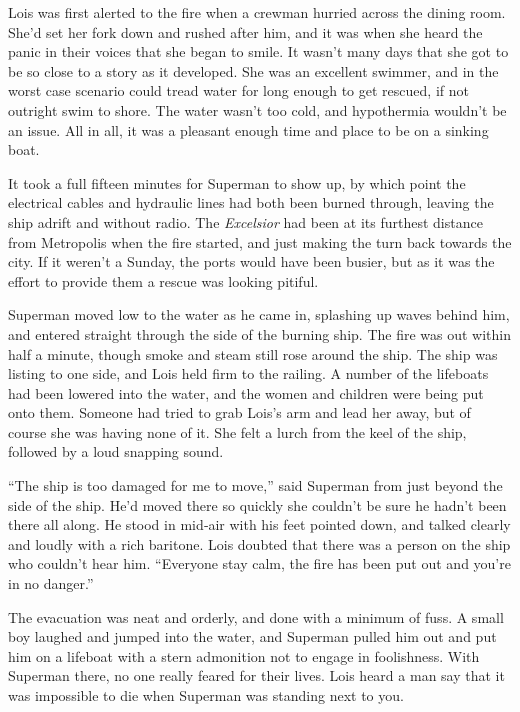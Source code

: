 \documentclass[ebook,12pt]{memoir}
\begin{document}
Lois was first alerted to the fire when a crewman hurried across the
dining room. She'd set her fork down and rushed after him, and it was
when she heard the panic in their voices that she began to smile. It
wasn't many days that she got to be so close to a story as it developed.
She was an excellent swimmer, and in the worst case scenario could tread
water for long enough to get rescued, if not outright swim to shore. The
water wasn't too cold, and hypothermia wouldn't be an issue. All in all,
it was a pleasant enough time and place to be on a sinking boat.

It took a full fifteen minutes for Superman to show up, by which point
the electrical cables and hydraulic lines had both been burned through,
leaving the ship adrift and without radio. The \emph{Excelsior} had been
at its furthest distance from Metropolis when the fire started, and just
making the turn back towards the city. If it weren't a Sunday, the ports
would have been busier, but as it was the effort to provide them a
rescue was looking pitiful.

Superman moved low to the water as he came in, splashing up waves behind
him, and entered straight through the side of the burning ship. The fire
was out within half a minute, though smoke and steam still rose around
the ship. The ship was listing to one side, and Lois held firm to the
railing. A number of the lifeboats had been lowered into the water, and
the women and children were being put onto them. Someone had tried to
grab Lois's arm and lead her away, but of course she was having none of
it. She felt a lurch from the keel of the ship, followed by a loud
snapping sound.

``The ship is too damaged for me to move,'' said Superman from just
beyond the side of the ship. He'd moved there so quickly she couldn't be
sure he hadn't been there all along. He stood in mid‐air with his feet
pointed down, and talked clearly and loudly with a rich baritone. Lois
doubted that there was a person on the ship who couldn't hear him.
``Everyone stay calm, the fire has been put out and you're in no
danger.''

The evacuation was neat and orderly, and done with a minimum of fuss. A
small boy laughed and jumped into the water, and Superman pulled him out
and put him on a lifeboat with a stern admonition not to engage in
foolishness. With Superman there, no one really feared for their lives.
Lois heard a man say that it was impossible to die when Superman was
standing next to you.
\end{document}
